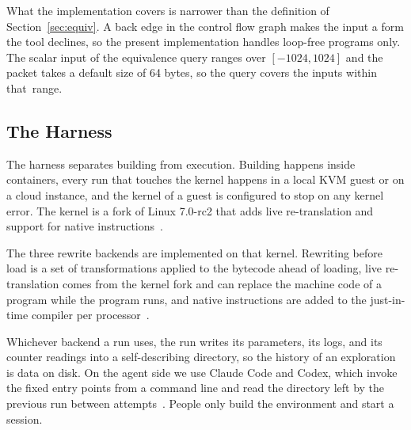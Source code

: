 

What the implementation covers is narrower than the definition of Section~\ref{sec:equiv}.
A back edge in the control flow graph makes the input a form the tool declines, so the present implementation handles loop-free programs only.
The scalar input of the equivalence query ranges over $[-1024, 1024]$ and the packet takes a default size of 64 bytes, so the query covers the inputs within that~range.

\subsection{The Harness}\label{sec:impl-harness}

The harness separates building from execution.
Building happens inside containers, every run that touches the kernel happens in a local KVM guest or on a cloud instance, and the kernel of a guest is configured to stop on any kernel error.
The kernel is a fork of Linux 7.0-rc2 that adds live re-translation and support for native instructions~\cite{zheng2026kops}.

The three rewrite backends are implemented on that kernel.
Rewriting before load is a set of transformations applied to the bytecode ahead of loading, live re-translation comes from the kernel fork and can replace the machine code of a program while the program runs, and native instructions are added to the just-in-time compiler per processor~\cite{zheng2026kops}.

Whichever backend a run uses, the run writes its parameters, its logs, and its counter readings into a self-describing directory, so the history of an exploration is data on disk.
On the agent side we use Claude Code and Codex, which invoke the fixed entry points from a command line and read the directory left by the previous run between attempts~\cite{claudecode2025,openaicodex2025}.
People only build the environment and start a session.
